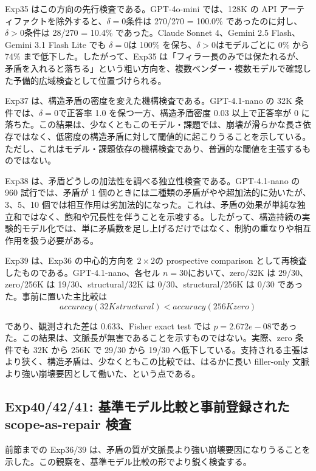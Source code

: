 \documentclass[12pt,a4paper]{article}
\begin{document}
Exp35 はこの方向の先行検査である。GPT-4o-mini では、128K の API アーティファクトを除外すると、\(\delta=0\)条件は 270/270 = 100.0\% であったのに対し、\(\delta>0\)条件は 28/270 = 10.4\% であった。Claude Sonnet 4、Gemini 2.5 Flash、Gemini 3.1 Flash Lite でも \(\delta=0\)は 100\% を保ち、\(\delta>0\)はモデルごとに 0\% から 74\% まで低下した。したがって、Exp35 は「フィラー長のみでは保たれるが、矛盾を入れると落ちる」という粗い方向を、複数ベンダー・複数モデルで確認した予備的広域検査として位置づけられる。

Exp37 は、構造矛盾の密度を変えた機構検査である。GPT-4.1-nano の 32K 条件では、\(\delta=0\)で正答率 1.0 を保つ一方、構造矛盾密度 0.03 以上で正答率が 0 に落ちた。この結果は、少なくともこのモデル・課題では、崩壊が滑らかな長さ依存ではなく、低密度の構造矛盾に対して閾値的に起こりうることを示している。ただし、これはモデル・課題依存の機構検査であり、普遍的な閾値を主張するものではない。

Exp38 は、矛盾どうしの加法性を調べる独立性検査である。GPT-4.1-nano の 960 試行では、矛盾が 1 個のときには二種類の矛盾がやや超加法的に効いたが、3、5、10 個では相互作用は劣加法的になった。これは、矛盾の効果が単純な独立和ではなく、飽和や冗長性を伴うことを示唆する。したがって、構造持続の実験的モデル化では、単に矛盾数を足し上げるだけではなく、制約の重なりや相互作用を扱う必要がある。

Exp39 は、Exp36 の中心的方向を \(2\times2\)の prospective comparison として再検査したものである。GPT-4.1-nano、各セル \(n=30\)において、zero/32K は 29/30、zero/256K は 19/30、structural/32K は 0/30、structural/256K は 0/30 であった。事前に置いた主比較は \[
accuracy(32K structural) < accuracy(256K zero)
\]

であり、観測された差は 0.633、Fisher exact test では \(p = 2.672e-08\)であった。この結果は、文脈長が無害であることを示すものではない。実際、zero 条件でも 32K から 256K で 29/30 から 19/30 へ低下している。支持される主張はより狭く、構造矛盾は、少なくともこの比較では、はるかに長い filler-only 文脈より強い崩壊要因として働いた、という点である。

\subsection{Exp40/42/41: 基準モデル比較と事前登録された scope-as-repair 検査}\label{exp404241-ux57faux6e96ux30e2ux30c7ux30ebux6bd4ux8f03ux3068ux4e8bux524dux767bux9332ux3055ux308cux305f-scope-as-repair-ux691cux67fb}

前節までの Exp36/39 は、矛盾の質が文脈長より強い崩壊要因になりうることを示した。この観察を、基準モデル比較の形でより鋭く検査する。
\end{document}

